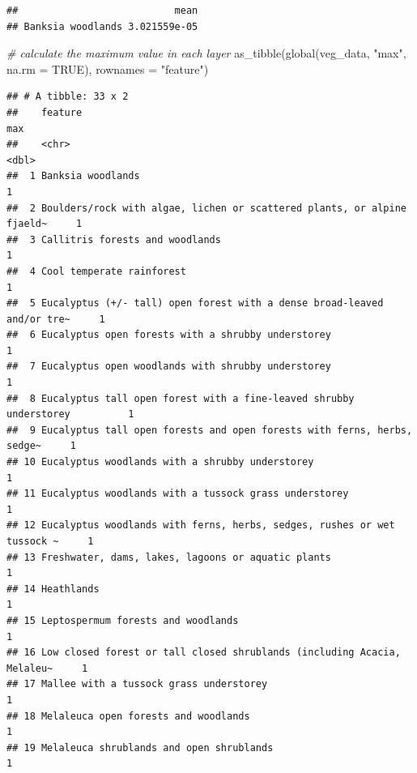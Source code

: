 \documentclass[
  12pt,
]{book}
\newenvironment{Shaded}{\begin{snugshade}}{\end{snugshade}}
\newcommand{\AttributeTok}[1]{\textcolor[rgb]{0.77,0.63,0.00}{#1}}
\newcommand{\CommentTok}[1]{\textcolor[rgb]{0.56,0.35,0.01}{\textit{#1}}}
\newcommand{\ConstantTok}[1]{\textcolor[rgb]{0.00,0.00,0.00}{#1}}
\newcommand{\FunctionTok}[1]{\textcolor[rgb]{0.00,0.00,0.00}{#1}}
\newcommand{\NormalTok}[1]{#1}
\newcommand{\StringTok}[1]{\textcolor[rgb]{0.31,0.60,0.02}{#1}}
\begin{document}
\begin{verbatim}
##                           mean
## Banksia woodlands 3.021559e-05
\end{verbatim}

\begin{Shaded}
\begin{Highlighting}[]
\CommentTok{\# calculate the maximum value in each layer}
\FunctionTok{as\_tibble}\NormalTok{(}\FunctionTok{global}\NormalTok{(veg\_data, }\StringTok{"max"}\NormalTok{, }\AttributeTok{na.rm =} \ConstantTok{TRUE}\NormalTok{), }\AttributeTok{rownames =} \StringTok{"feature"}\NormalTok{)}
\end{Highlighting}
\end{Shaded}

\begin{verbatim}
## # A tibble: 33 x 2
##    feature                                                                   max
##    <chr>                                                                   <dbl>
##  1 Banksia woodlands                                                           1
##  2 Boulders/rock with algae, lichen or scattered plants, or alpine fjaeld~     1
##  3 Callitris forests and woodlands                                             1
##  4 Cool temperate rainforest                                                   1
##  5 Eucalyptus (+/- tall) open forest with a dense broad-leaved and/or tre~     1
##  6 Eucalyptus open forests with a shrubby understorey                          1
##  7 Eucalyptus open woodlands with shrubby understorey                          1
##  8 Eucalyptus tall open forest with a fine-leaved shrubby understorey          1
##  9 Eucalyptus tall open forests and open forests with ferns, herbs, sedge~     1
## 10 Eucalyptus woodlands with a shrubby understorey                             1
## 11 Eucalyptus woodlands with a tussock grass understorey                       1
## 12 Eucalyptus woodlands with ferns, herbs, sedges, rushes or wet tussock ~     1
## 13 Freshwater, dams, lakes, lagoons or aquatic plants                          1
## 14 Heathlands                                                                  1
## 15 Leptospermum forests and woodlands                                          1
## 16 Low closed forest or tall closed shrublands (including Acacia, Melaleu~     1
## 17 Mallee with a tussock grass understorey                                     1
## 18 Melaleuca open forests and woodlands                                        1
## 19 Melaleuca shrublands and open shrublands                                    1

\end{verbatim}
\end{document}
